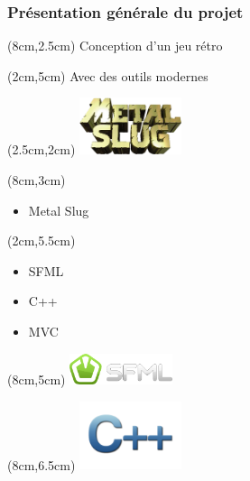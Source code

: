 \begin{frame}
	
	\frametitle{Présentation générale du projet}
	
	
	
	\begin{textblock*}{5cm}(8cm,2.5cm)
		Conception d'un jeu rétro
	\end{textblock*}
	
	\begin{textblock*}{5cm}(2cm,5cm)
		Avec des outils modernes
	\end{textblock*}
	
	{
		\begin{textblock*}{3cm}(2.5cm,2cm)
			\includegraphics[width=3cm]{figures/logo_metal_slug.png}
		\end{textblock*}
	
		\begin{textblock*}{5cm}(8cm,3cm)
			\begin{itemize}
				[triangle]
				\item Metal Slug
			\end{itemize}
		\end{textblock*}
	}
	
	{
		\begin{textblock*}{5cm}(2cm,5.5cm)
			\begin{itemize}
				\item SFML
			\end{itemize}
			\begin{itemize}
				\item C++
			\end{itemize}
			\begin{itemize}
				\item MVC
			\end{itemize}
		\end{textblock*}
	
		\begin{textblock*}{3cm}(8cm,5cm)
			\includegraphics[width=3cm]{figures/logo_sfml.png}
		\end{textblock*}
	
		\begin{textblock*}{3cm}(8cm,6.5cm)
			\includegraphics[width=3cm]{figures/logo_c++.png}
		\end{textblock*}
	}
	
\end{frame}
